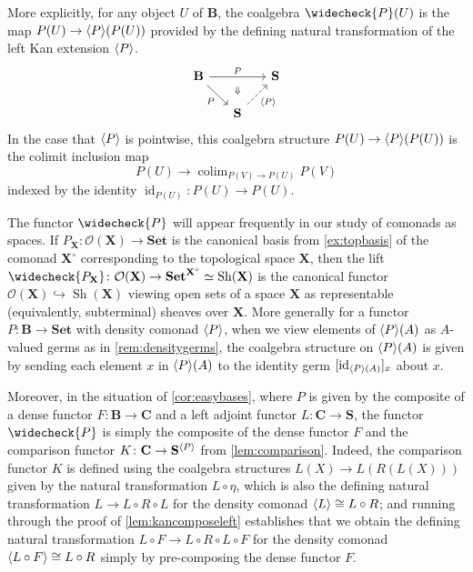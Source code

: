 \documentclass[11pt, oneside, article]{memoir}
\theoremstyle{plain}
\theoremstyle{definition}
\theoremstyle{remark}
\newenvironment{remark}
{\renewcommand\qedsymbol{$\lrcorner$}%
  \pushQED{\qed}\myremark}
{\popQED\endmyremark}
\DeclareMathOperator{\id}{id}
\DeclareMathOperator{\Sh}{Sh}
\DeclareMathOperator*{\colim}{colim}
\DeclarePairedDelimiter{\gen}{\langle}{\rangle}
\newcommand{\namedcat}[1]{\mathbf{#1}}
\newcommand{\cat}[1]{\mathbf{#1}}
\newcommand{\spa}[1]{\mathbf{#1}}
\newcommand{\Set}{\namedcat{Set}}
\newcommand{\CoalgOn}[2]{{#2}^{#1}}
\newcommand{\CoalgSet}[1]{\CoalgOn{#1}{\Set}}
\newcommand{\CoalgS}[1]{\CoalgOn{#1}{\bS}}
\newcommand{\lift}[1]{\widecheck{#1}}
\newcommand{\ph}[1]{#1}
\newcommand{\topbasis}[1]{\pP_{#1}}
\newcommand{\xA}{A}
\newcommand{\xU}{U}
\newcommand{\xV}{V}
\newcommand{\xX}{X}
\newcommand{\bB}{\cat{B}}
\newcommand{\bC}{\cat{C}}
\newcommand{\bS}{\cat{S}}
\newcommand{\pP}{\ph{P}}
\newcommand{\cP}{\gen{\pP}}
\newcommand{\lP}{\lift{\pP}}
\newcommand{\tX}{\spa{X}}
\newcommand{\cX}{\toptocmd{\tX}}
\newcommand{\PS}{\CoalgS{\cP}}
\newcommand{\toptocmd}[1]{{{#1}^\circ}}
\newcommand{\opens}[1]{\mathcal{O}(#1)}
\begin{document}
\begin{remark}\label{rem:lift}\label{rem:pointwiseformula}\label{rem:liftiscomparison}
  More explicitly, for any object $\xU$ of $\bB$, the coalgebra
  $\lP(\xU)$ is the map $\pP(\xU)\to \cP(\pP(\xU))$ provided by the
  defining natural transformation of
  the left Kan extension $\cP$.
  \[
    \begin{tikzcd}[column sep=15pt, row sep=15pt]
      {\bB} &{}& {\bS} \\
      & {\bS}
      \arrow["\pP", from=1-1, to=1-3]
      \arrow["\pP"', from=1-1, to=2-2]
      \arrow["\cP"', dashed, from=2-2, to=1-3]
      \arrow["\Downarrow"{description, pos=0.3}, draw=none, from=1-2, to=2-2]
    \end{tikzcd}
  \]
  In the case that $\cP$ is pointwise, this coalgebra structure
  $\pP(\xU)\to \cP(\pP(\xU))$ is the colimit inclusion map
  \[\pP(\xU) \to \colim_{\pP(\xV) \to \pP(\xU)} \pP(\xV)\]
  indexed by the identity
  $\id_{\pP(\xU)} \colon \pP(\xU) \to \pP(\xU)$.

  The functor $\lP$ will appear frequently in our study of comonads as
  spaces. If $\topbasis{\tX} \colon \opens{\tX} \to \Set$ is the
  canonical basis from \cref{ex:topbasis} of the comonad $\cX$
  corresponding to the topological space $\tX$, then the lift
  $\lift{\topbasis{\tX}} \colon \opens{\tX} \to \CoalgSet{\cX} \simeq
  \Sh(\tX)$ is the canonical functor
  $\opens{\tX} \hookrightarrow \Sh(\tX)$ viewing open sets of a space
  $\tX$ as representable (equivalently, subterminal) sheaves over
  $\tX$. More generally for a functor $\pP \colon \bB \to \Set$ with
  density comonad $\cP$, when we view elements of $\cP(\xA)$ as
  $\xA$-valued germs as in \cref{rem:densitygerms}, the coalgebra
  structure on $\cP(\xA)$ is given by sending each element $x$ in
  $\cP(\xA)$ to the identity germ $[\id_{\cP(\xA)}]_x$ about $x$.

  Moreover, in the situation of \cref{cor:easybases}, where $\pP$ is
  given by the composite of a dense functor $F \colon \bB \to \bC$ and
  a left adjoint functor $L \colon \bC \to \bS$, the functor $\lP$ is
  simply the composite of the dense functor $F$ and the comparison
  functor $K \colon \bC \to \PS$ from \cref{lem:comparison}. Indeed,
  the comparison functor $K$ is defined using the coalgebra structures
  $L(\xX) \to L(R(L(\xX)))$ given by the natural transformation
  $L \circ \eta$, which is also the defining natural transformation
  $L \rightarrow L \circ R \circ L$ for the density comonad
  $\gen{L} \cong L \circ R$; and running through the proof of
  \cref{lem:kancomposeleft} establishes that we obtain the defining
  natural transformation
  $L \circ F \rightarrow L \circ R \circ L \circ F$ for the density
  comonad $\gen{L \circ F} \cong L \circ R$ simply by pre-composing
  the dense functor $F$.


\end{remark}
\end{document}
